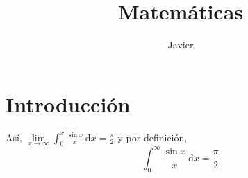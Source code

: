 \documentclass{article}
\title{Matemáticas}
\author{Javier}
\begin{document}
\maketitle

\section{Introducción}

Así, $\lim\limits_{x\to\infty}\int_0^x\frac{\sin x}{x}\,\mathrm{d}x
=\frac{\pi}{2}$ y por definición,
\begin{equation*}
\int_0^\infty\frac{\sin x}{x}\,\mathrm{d}x=\frac{\pi}{2}
\end{equation*}
\end{document}

